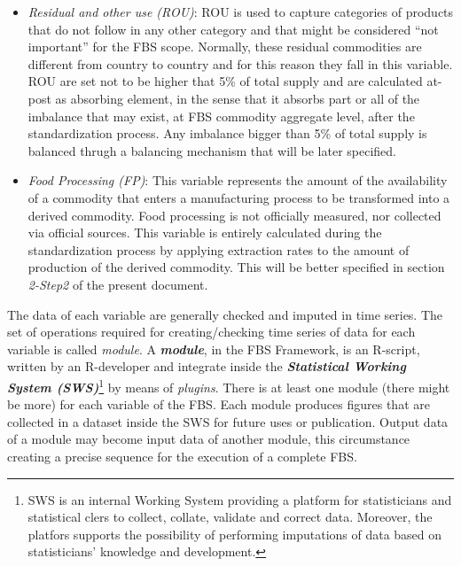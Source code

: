\documentclass[]{article}
\let\rmarkdownfootnote\footnote%
\def\footnote{\protect\rmarkdownfootnote}
\begin{document}
\begin{itemize}
  organizations and so on. The missing data are imputed using a
  hyerarchical model based on commodity groups\footnote{ask for links to
    a proper documentation}.
\item
  \emph{Residual and other use (ROU)}: ROU is used to capture categories
  of products that do not follow in any other category and that might be
  considered ``not important'' for the FBS scope. Normally, these
  residual commodities are different from country to country and for
  this reason they fall in this variable. ROU are set not to be higher
  that 5\% of total supply and are calculated at-post as absorbing
  element, in the sense that it absorbs part or all of the imbalance
  that may exist, at FBS commodity aggregate level, after the
  standardization process. Any imbalance bigger than 5\% of total supply
  is balanced thrugh a balancing mechanism that will be later specified.
\item
  \emph{Food Processing (FP)}: This variable represents the amount of
  the availability of a commodity that enters a manufacturing process to
  be transformed into a derived commodity. Food processing is not
  officially measured, nor collected via official sources. This variable
  is entirely calculated during the standardization process by applying
  extraction rates to the amount of production of the derived commodity.
  This will be better specified in section \emph{2-Step2} of the present
  document.
\end{itemize}

The data of each variable are generally checked and imputed in time
series. The set of operations required for creating/checking time series
of data for each variable is called \emph{module}. A
\textbf{\emph{module}}, in the FBS Framework, is an R-script, written by
an R-developer and integrate inside the \textbf{\emph{Statistical
Working System (SWS)}}\footnote{SWS is an internal Working System
  providing a platform for statisticians and statistical clers to
  collect, collate, validate and correct data. Moreover, the platfors
  supports the possibility of performing imputations of data based on
  statisticians' knowledge and development.} by means of \emph{plugins}.
There is at least one module (there might be more) for each variable of
the FBS. Each module produces figures that are collected in a dataset
inside the SWS for future uses or publication. Output data of a module
may become input data of another module, this circumstance creating a
precise sequence for the execution of a complete FBS.
\end{document}
